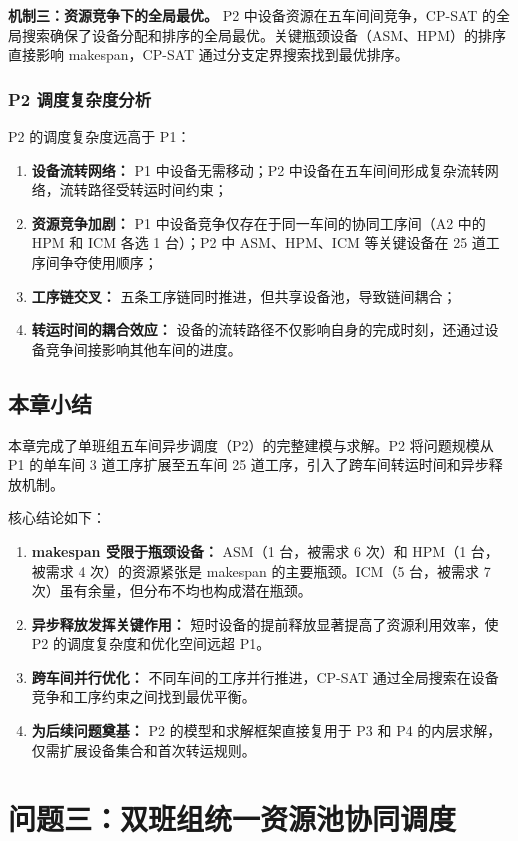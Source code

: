 \documentclass[UTF8,a4paper,12pt]{ctexart}
\begin{document}
\textbf{机制三：资源竞争下的全局最优。} P2 中设备资源在五车间间竞争，CP-SAT 的全局搜索确保了设备分配和排序的全局最优。关键瓶颈设备（ASM、HPM）的排序直接影响 makespan，CP-SAT 通过分支定界搜索找到最优排序。

\subsection{P2 调度复杂度分析}
P2 的调度复杂度远高于 P1：
\begin{enumerate}
  \item \textbf{设备流转网络：} P1 中设备无需移动；P2 中设备在五车间间形成复杂流转网络，流转路径受转运时间约束；
  \item \textbf{资源竞争加剧：} P1 中设备竞争仅存在于同一车间的协同工序间（A2 中的 HPM 和 ICM 各选 1 台）；P2 中 ASM、HPM、ICM 等关键设备在 25 道工序间争夺使用顺序；
  \item \textbf{工序链交叉：} 五条工序链同时推进，但共享设备池，导致链间耦合；
  \item \textbf{转运时间的耦合效应：} 设备的流转路径不仅影响自身的完成时刻，还通过设备竞争间接影响其他车间的进度。
\end{enumerate}

\section{本章小结}
本章完成了单班组五车间异步调度（P2）的完整建模与求解。P2 将问题规模从 P1 的单车间 3 道工序扩展至五车间 25 道工序，引入了跨车间转运时间和异步释放机制。

核心结论如下：
\begin{enumerate}
  \item \textbf{makespan 受限于瓶颈设备：} ASM（1 台，被需求 6 次）和 HPM（1 台，被需求 4 次）的资源紧张是 makespan 的主要瓶颈。ICM（5 台，被需求 7 次）虽有余量，但分布不均也构成潜在瓶颈。
  \item \textbf{异步释放发挥关键作用：} 短时设备的提前释放显著提高了资源利用效率，使 P2 的调度复杂度和优化空间远超 P1。
  \item \textbf{跨车间并行优化：} 不同车间的工序并行推进，CP-SAT 通过全局搜索在设备竞争和工序约束之间找到最优平衡。
  \item \textbf{为后续问题奠基：} P2 的模型和求解框架直接复用于 P3 和 P4 的内层求解，仅需扩展设备集合和首次转运规则。
\end{enumerate}

\chapter{问题三：双班组统一资源池协同调度}
\end{document}

